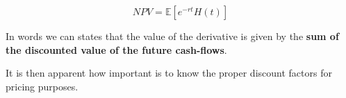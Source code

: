 \begin{equation}
NPV = \mathbb{E}[e^{-rt} H(t)]
\end{equation}

In words we can states that the value of the derivative is given by the \textbf{sum of the discounted value of the future cash-flows}.

It is then apparent how important is to know the proper discount factors for pricing purposes.

%
%
%
%
%
%
%
%
%

